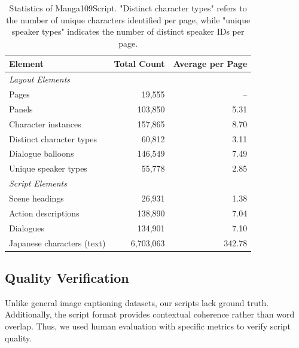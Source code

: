 \documentclass[sigconf, screen, review, anonymous]{acmart}
\begin{document}
\begin{table}[t]
\setlength{\abovecaptionskip}{2pt}
\caption{
Statistics of Manga109Script. "Distinct character types" refers to the number of unique characters identified per page, while "unique speaker types" indicates the number of distinct speaker IDs per page.
}
\centering
\begin{tabular}{l r r}
\toprule
\textbf{Element} & \textbf{Total Count} & \textbf{Average per Page} \\
\midrule
\multicolumn{3}{l}{\textit{Layout Elements}} \\
\hspace{0.5em}Pages & 19,555 & \---\\
\hspace{0.5em}Panels & 103,850 & 5.31 \\
\hspace{0.5em}Character instances & 157,865 & 8.70 \\
\hspace{0.5em}Distinct character types & 60,812 & 3.11 \\
\hspace{0.5em}Dialogue balloons & 146,549 & 7.49 \\
\hspace{0.5em}Unique speaker types & 55,778 & 2.85 \\
\midrule
\multicolumn{3}{l}{\textit{Script Elements}} \\
\hspace{0.5em}Scene headings & 26,931 & 1.38 \\
\hspace{0.5em}Action descriptions & 138,890 & 7.04 \\
\hspace{0.5em}Dialogues & 134,901 & 7.10 \\
\hspace{0.5em}Japanese characters (text) & 6,703,063 & 342.78 \\
\bottomrule
\end{tabular}
\label{tab:statistics}
\end{table}

\subsection{Quality Verification}
Unlike general image captioning datasets, our scripts lack ground truth.
Additionally, the script format provides contextual coherence rather than word overlap.
Thus, we used human evaluation with specific metrics to verify script quality.
\end{document}
